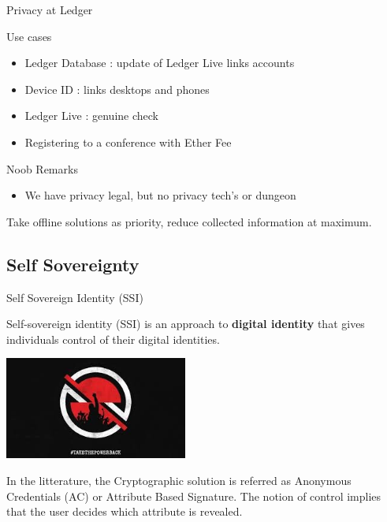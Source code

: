   \begin{frame}{Privacy at Ledger}
  
  \begin{block}{Use cases}
    \begin{itemize}
     \item Ledger Database : update of Ledger Live links accounts
     \item Device ID : links desktops and phones
     \item Ledger Live :  genuine check
     \item Registering to a conference with Ether Fee
    \end{itemize}
    \end{block}
   
   \begin{alertblock}{Noob Remarks}
    \begin{itemize}
     \item We have privacy legal, but no privacy tech's or dungeon
     
    \end{itemize}   
   \end{alertblock}

   Take offline solutions as priority, reduce collected information at maximum.

  \end{frame}





  \subsection{Self Sovereignty}
  \begin{frame}{Self Sovereign Identity (SSI)}
  
  \begin{definition}[Wikipedia]
  Self-sovereign identity (SSI) is an approach to {\bf digital identity} that gives individuals {\color{red} control} of their digital identities.
  \end{definition}
  
  \begin{center}
  \includegraphics[width=6cm]{images/takeback.jpg}
  \end{center}

     
  In the litterature, the Cryptographic solution is referred as Anonymous Credentials (AC) or Attribute Based Signature. The notion of control implies that the user decides which attribute is revealed.

  \end{frame}
